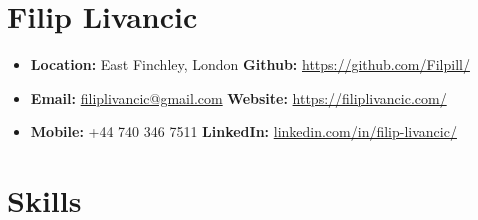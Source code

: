 \documentclass[a4paper, 9pt]{article}
\date{}
\begin{document}
\vspace*{-4.5mm}

\section*{Filip Livancic}
\vspace{-2.5mm}

\begin{itemize}[itemsep=-0.2em]
    \item[] \faMapO \hspace{1mm} \textbf{Location:} \hspace{0.2mm}East Finchley, London 
        \hspace{41.5mm} \faGithub \hspace{2mm} \textbf{Github:} \hspace{2,5mm} \url{https://github.com/Filpill/}
    \item[] \faEnvelope \hspace{1.6mm} \textbf{Email:} \hspace{3.5mm} \href{mailto:filiplivancic@gmail.com}{filiplivancic@gmail.com} 
        \hspace{38mm} \faGlobe \hspace{2mm} \textbf{Website:} \hspace{1.2mm} \url{https://filiplivancic.com/}
    \item[] \faPhone \hspace{2.2mm} \textbf{Mobile:} \hspace{1.5mm} +44 740 346 7511
        \hspace{46mm} \faLinkedinSquare \hspace{2mm} \textbf{LinkedIn:} \hspace{0.5mm}\url{linkedin.com/in/filip-livancic/}
\end{itemize}

\section*{Skills}
\vspace{-2.5mm}
\end{document}
